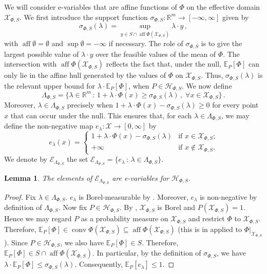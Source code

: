 \documentclass[10pt, a4paper]{article}
\newcommand{\E}{\mathbb E}
\newcommand{\e}{e}
\newcommand{\Ee}{\mathcal E}
\newcommand{\EeP}{\Ee_{\LP}}
\newcommand{\Hh}{\mathcal H}
\newcommand{\HhP}{\Hh_{\Phi,S}}
\newcommand{\LP}{\Lambda_{\Phi,S}}
\newcommand{\R}{\mathbb R}
\newcommand{\sP}{\sigma_{\Phi,S}}
\newcommand{\X}{\mathcal X}
\newcommand{\XP}{\X_{\Phi,S}}
\DeclareMathOperator{\aff}{aff}
\DeclareMathOperator{\conv}{conv}
\newtheorem{lemma}{Lemma}
\begin{document}
We will consider e-variables that are affine functions of $\Phi$ on the effective domain $\XP$. We first introduce the support function $\sP:\R^m\to[-\infty,\infty]$ given by
$$\sP(\lambda) = \sup_{y\in S\cap\aff\Phi(\XP)}\lambda\cdot y\,,$$
with $\aff\emptyset = \emptyset$ and $\sup\emptyset = -\infty$ if necessary. The role of $\sP$ is to give the largest possible value of $\lambda\cdot y$ over the feasible values of the mean of $\Phi$. The intersection with $\aff\Phi(\XP)$ reflects the fact that, under the null, $\E_P[\Phi]$ can only lie in the affine hull generated by the values of $\Phi$ on $\XP$. Thus, $\sP(\lambda)$ is the relevant upper bound for $\lambda\cdot\E_P[\Phi]$, when $P\in\HhP$. We now define
$$\LP = \{\lambda\in\R^m\,:\,1+\lambda\cdot\Phi(x)\geq\sP(\lambda)\,,\;\forall x\in\XP\}\,.$$
Moreover, $\lambda\in\LP$ precisely when $1+\lambda\cdot\Phi(x)-\sP(\lambda)\geq 0$ for every point $x$ that can occur under the null. This ensures that, for each $\lambda\in\LP$, we may define the non-negative map $\e_\lambda:\X\to[0,\infty]$ by
$$\e_\lambda(x) = \begin{cases} 1+\lambda\cdot\Phi(x)-\sP(\lambda) & \text{if $x\in\XP$;}\\ +\infty & \text{if $x\notin\XP$.}\end{cases}$$
We denote by $\EeP$ the set $\EeP = \{\e_\lambda\,:\,\lambda\in\LP\}$.
\begin{lemma}\label{lemma:EePevar}
    The elements of $\EeP$ are e-variables for $\HhP$. 
\end{lemma}
\begin{proof}
    Fix $\lambda\in\LP$. $\e_\lambda$ is Borel-measurable by . Moreover, $\e_\lambda$ is non-negative by definition of $\LP$. Now fix $P\in\HhP$. By , $\XP$ is Borel and $P(\XP)=1$. Hence we may regard $P$ as a probability measure on $\XP$ and restrict $\Phi$ to $\XP$. Therefore, $\E_P[\Phi]\in\conv\Phi(\XP)\subseteq\aff\Phi(\XP)$ (this is  in  applied to $\Phi|_{\XP}$). Since $P\in\HhP$, we also have $\E_P[\Phi]\in S$. Therefore, $\E_P[\Phi]\in S\cap\aff\Phi(\XP)$. In particular, by the definition of $\sP$, we have $\lambda\cdot\E_P[\Phi]\leq\sP(\lambda)$. Consequently, $\E_P[\e_\lambda]\leq 1$.
\end{proof}
\end{document}
